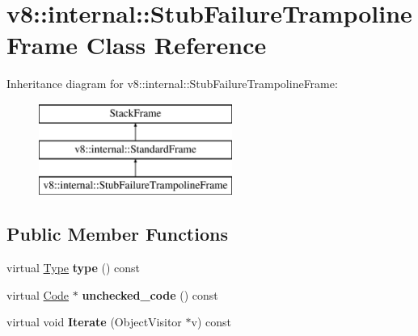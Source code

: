 \hypertarget{classv8_1_1internal_1_1_stub_failure_trampoline_frame}{}\section{v8\+:\+:internal\+:\+:Stub\+Failure\+Trampoline\+Frame Class Reference}
\label{classv8_1_1internal_1_1_stub_failure_trampoline_frame}
Inheritance diagram for v8\+:\+:internal\+:\+:Stub\+Failure\+Trampoline\+Frame\+:\begin{figure}[H]
\begin{center}
\leavevmode
\includegraphics[height=3.000000cm]{classv8_1_1internal_1_1_stub_failure_trampoline_frame}
\end{center}
\end{figure}
\subsection*{Public Member Functions}
\begin{DoxyCompactItemize}
\item 
\hypertarget{classv8_1_1internal_1_1_stub_failure_trampoline_frame_afb05923cddc942564a40141b1aa25a0e}{}virtual \hyperlink{classv8_1_1internal_1_1_type_impl}{Type} {\bfseries type} () const \label{classv8_1_1internal_1_1_stub_failure_trampoline_frame_afb05923cddc942564a40141b1aa25a0e}

\item 
\hypertarget{classv8_1_1internal_1_1_stub_failure_trampoline_frame_a1e4c496fa5972bcc201f062604815d37}{}virtual \hyperlink{classv8_1_1internal_1_1_code}{Code} $\ast$ {\bfseries unchecked\+\_\+code} () const \label{classv8_1_1internal_1_1_stub_failure_trampoline_frame_a1e4c496fa5972bcc201f062604815d37}

\item 
\hypertarget{classv8_1_1internal_1_1_stub_failure_trampoline_frame_ad330bcf20b92e966fa87c6e24ebf2998}{}virtual void {\bfseries Iterate} (Object\+Visitor $\ast$v) const \label{classv8_1_1internal_1_1_stub_failure_trampoline_frame_ad330bcf20b92e966fa87c6e24ebf2998}

\end{DoxyCompactItemize}

